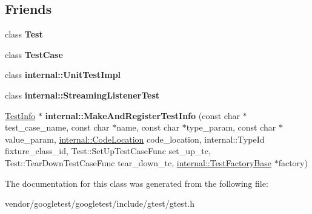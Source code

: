 \subsection*{Friends}
\begin{DoxyCompactItemize}
\item 
class {\bfseries Test}\hypertarget{classtesting_1_1TestInfo_a5b78b1c2e1fa07ffed92da365593eaa4}{}\label{classtesting_1_1TestInfo_a5b78b1c2e1fa07ffed92da365593eaa4}

\item 
class {\bfseries Test\+Case}\hypertarget{classtesting_1_1TestInfo_aff779e55b06adfa7c0088bd10253f0f0}{}\label{classtesting_1_1TestInfo_aff779e55b06adfa7c0088bd10253f0f0}

\item 
class {\bfseries internal\+::\+Unit\+Test\+Impl}\hypertarget{classtesting_1_1TestInfo_acc0a5e7573fd6ae7ad1878613bb86853}{}\label{classtesting_1_1TestInfo_acc0a5e7573fd6ae7ad1878613bb86853}

\item 
class {\bfseries internal\+::\+Streaming\+Listener\+Test}\hypertarget{classtesting_1_1TestInfo_adc037d188dab349a94868991955c9cd4}{}\label{classtesting_1_1TestInfo_adc037d188dab349a94868991955c9cd4}

\item 
\hyperlink{classtesting_1_1TestInfo}{Test\+Info} $\ast$ {\bfseries internal\+::\+Make\+And\+Register\+Test\+Info} (const char $\ast$test\+\_\+case\+\_\+name, const char $\ast$name, const char $\ast$type\+\_\+param, const char $\ast$value\+\_\+param, \hyperlink{structtesting_1_1internal_1_1CodeLocation}{internal\+::\+Code\+Location} code\+\_\+location, internal\+::\+Type\+Id fixture\+\_\+class\+\_\+id, Test\+::\+Set\+Up\+Test\+Case\+Func set\+\_\+up\+\_\+tc, Test\+::\+Tear\+Down\+Test\+Case\+Func tear\+\_\+down\+\_\+tc, \hyperlink{classtesting_1_1internal_1_1TestFactoryBase}{internal\+::\+Test\+Factory\+Base} $\ast$factory)\hypertarget{classtesting_1_1TestInfo_a70ddf8a12d8c05f17429f6381abc8ace}{}\label{classtesting_1_1TestInfo_a70ddf8a12d8c05f17429f6381abc8ace}

\end{DoxyCompactItemize}


The documentation for this class was generated from the following file\+:\begin{DoxyCompactItemize}
\item 
vendor/googletest/googletest/include/gtest/gtest.\+h\end{DoxyCompactItemize}
